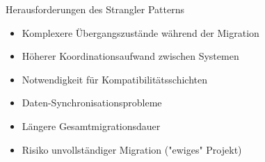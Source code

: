 \begin{concept}{Herausforderungen des Strangler Patterns}\\
    \begin{itemize}
        \item Komplexere Übergangszustände während der Migration
        \item Höherer Koordinationsaufwand zwischen Systemen
        \item Notwendigkeit für Kompatibilitätsschichten
        \item Daten-Synchronisationsprobleme
        \item Längere Gesamtmigrationsdauer
        \item Risiko unvollständiger Migration ("ewiges" Projekt)
    \end{itemize}
\end{concept}

